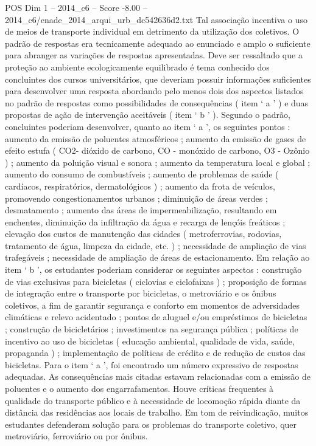 \begin{textsample}{POS Dim 1 – 2014\_c6 – Score -8.00 – 2014\_c6/enade\_2014\_arqui\_urb\_dc542636d2.txt}
Tal associação incentiva o uso de meios de transporte individual em detrimento da utilização dos coletivos.
O padrão de respostas era tecnicamente adequado ao enunciado e amplo o suficiente para abranger as variações de respostas apresentadas.
Deve ser ressaltado que a proteção ao ambiente ecologicamente equilibrado é tema conhecido dos concluintes dos cursos universitários, que deveriam possuir informações suficientes para desenvolver uma resposta abordando pelo menos dois dos aspectos listados no padrão de respostas como possibilidades de consequências ( item ‘ a ’ ) e duas propostas de ação de intervenção aceitáveis ( item ‘ b ’ ).
Segundo o padrão, concluintes poderiam desenvolver, quanto ao item ‘ a ’, os seguintes pontos : aumento da emissão de poluentes atmosféricos ; aumento da emissão de gases de efeito estufa ( CO2- dióxido de carbono, CO - monóxido de carbono, O3 - Ozônio ) ; aumento da poluição visual e sonora ; aumento da temperatura local e global ; aumento do consumo de combustíveis ; aumento de problemas de saúde ( cardíacos, respiratórios, dermatológicos ) ; aumento da frota de veículos, promovendo congestionamentos urbanos ; diminuição de áreas verdes ; desmatamento ; aumento das áreas de impermeabilização, resultando em enchentes, diminuição da infiltração da água e recarga de lençóis freáticos ; elevação dos custos de manutenção das cidades ( metroferrovias, rodovias, tratamento de água, limpeza da cidade, etc. ) ; necessidade de ampliação de vias trafegáveis ; necessidade de ampliação de áreas de estacionamento.
Em relação ao item ‘ b ’, os estudantes poderiam considerar os seguintes aspectos : construção de vias exclusivas para bicicletas ( ciclovias e ciclofaixas ) ; proposição de formas de integração entre o transporte por bicicletas, o metroviário e os ônibus coletivos, a fim de garantir segurança e conforto em momentos de adversidades climáticas e relevo acidentado ; pontos de aluguel e/ou empréstimos de bicicletas ; construção de bicicletários ; investimentos na segurança pública ; políticas de incentivo ao uso de bicicletas ( educação ambiental, qualidade de vida, saúde, propaganda ) ; implementação de políticas de crédito e de redução de custos das bicicletas.
Para o item ‘ a ’, foi encontrado um número expressivo de respostas adequadas.
As consequências mais citadas estavam relacionadas com a emissão de poluentes e o aumento dos engarrafamentos.
Houve críticas frequentes à qualidade do transporte público e à necessidade de locomoção rápida diante da distância das residências aos locais de trabalho.
Em tom de reivindicação, muitos estudantes defenderam solução para os problemas do transporte coletivo, quer metroviário, ferroviário ou por ônibus.

\end{textsample}

